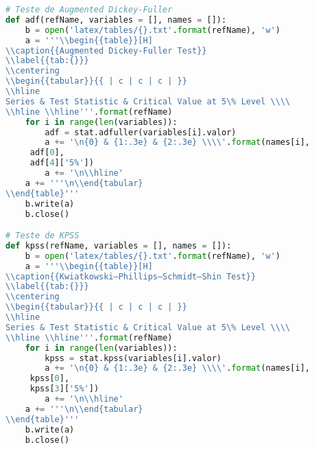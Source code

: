 \begin{lstlisting}[language=Python]
# Teste de Augmented Dickey-Fuller
def adf(refName, variables = [], names = []):
    b = open('latex/tables/{}.txt'.format(refName), 'w')
    a = '''\\begin{{table}}[H]
\\caption{{Augmented Dickey-Fuller Test}}
\\label{{tab:{}}}
\\centering
\\begin{{tabular}}{{ | c | c | c | }}
\\hline
Series & Test Statistic & Critical Value at 5\% Level \\\\
\\hline \\hline'''.format(refName)
    for i in range(len(variables)):
        adf = stat.adfuller(variables[i].valor)
        a += '\n{0} & {1:.3e} & {2:.3e} \\\\'.format(names[i],
     adf[0],
     adf[4]['5%'])
        a += '\n\\hline'
    a += '''\n\\end{tabular}
\\end{table}'''
    b.write(a)
    b.close()

# Teste de KPSS
def kpss(refName, variables = [], names = []):
    b = open('latex/tables/{}.txt'.format(refName), 'w')
    a = '''\\begin{{table}}[H]
\\caption{{Kwiatkowski–Phillips–Schmidt–Shin Test}}
\\label{{tab:{}}}
\\centering
\\begin{{tabular}}{{ | c | c | c | }}
\\hline
Series & Test Statistic & Critical Value at 5\% Level \\\\
\\hline \\hline'''.format(refName)
    for i in range(len(variables)):
        kpss = stat.kpss(variables[i].valor)
        a += '\n{0} & {1:.3e} & {2:.3e} \\\\'.format(names[i],
     kpss[0],
     kpss[3]['5%'])
        a += '\n\\hline'
    a += '''\n\\end{tabular}
\\end{table}'''
    b.write(a)
    b.close()


\end{lstlisting}
